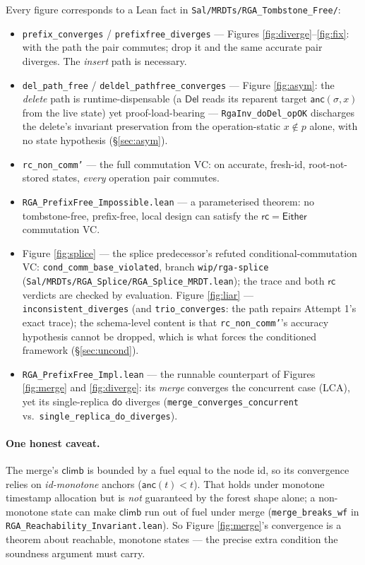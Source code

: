 \documentclass[11pt]{article}
\newcommand{\anc}{\mathsf{anc}}
\newcommand{\climb}{\mathsf{climb}}
\newcommand{\rc}{\mathsf{rc}}
\newcommand{\doo}{\mathsf{do}}
\newcommand{\Del}{\mathsf{Del}}
\newcommand{\Either}{\mathsf{Either}}
\begin{document}
Every figure corresponds to a Lean fact in
\texttt{Sal/MRDTs/RGA\_Tombstone\_Free/}:
\begin{itemize}
  \item \texttt{prefix\_converges} / \texttt{prefixfree\_diverges} --- Figures
        \ref{fig:diverge}--\ref{fig:fix}: with the path the pair commutes; drop it
        and the same accurate pair diverges. The \emph{insert} path is necessary.
  \item \texttt{del\_path\_free} / \texttt{deldel\_pathfree\_converges} --- Figure
        \ref{fig:asym}: the \emph{delete} path is runtime-dispensable (a $\Del$ reads
        its reparent target $\anc(\sigma,x)$ from the live state) yet
        proof-load-bearing --- \texttt{RgaInv\_doDel\_opOK} discharges the delete's
        invariant preservation from the operation-static $x\notin p$ alone, with no
        state hypothesis (\S\ref{sec:asym}).
  \item \texttt{rc\_non\_comm'} --- the full commutation VC: on accurate,
        fresh-id, root-not-stored states, \emph{every} operation pair commutes.
  \item \texttt{RGA\_PrefixFree\_Impossible.lean} --- a parameterised theorem: no
        tombstone-free, prefix-free, local design can satisfy the $\rc=\Either$
        commutation VC.
  \item Figure \ref{fig:splice} --- the splice predecessor's refuted
        conditional-commutation VC: \texttt{cond\_comm\_base\_violated}, branch
        \texttt{wip/rga-splice}
        (\texttt{Sal/MRDTs/RGA\_Splice/RGA\_Splice\_MRDT.lean}); the trace and
        both $\rc$ verdicts are checked by evaluation. Figure
        \ref{fig:liar} --- \texttt{inconsistent\_diverges} (and
        \texttt{trio\_converges}: the path repairs Attempt 1's exact trace);
        the schema-level content is that \texttt{rc\_non\_comm'}'s accuracy
        hypothesis cannot be dropped, which is what forces the conditioned
        framework (\S\ref{sec:uncond}).
  \item \texttt{RGA\_PrefixFree\_Impl.lean} --- the runnable counterpart of
        Figures \ref{fig:merge} and \ref{fig:diverge}: its \emph{merge} converges
        the concurrent case (LCA), yet its single-replica $\doo$ diverges
        (\texttt{merge\_converges\_concurrent} vs.\
        \texttt{single\_replica\_do\_diverges}).
\end{itemize}

\paragraph{One honest caveat.} The merge's $\climb$ is bounded by a fuel equal to
the node id, so its convergence relies on \emph{id-monotone} anchors
($\anc(t) < t$). That holds under monotone timestamp allocation but is \emph{not}
guaranteed by the forest shape alone; a non-monotone state can make $\climb$ run
out of fuel under merge (\texttt{merge\_breaks\_wf} in
\texttt{RGA\_Reachability\_Invariant.lean}). So Figure \ref{fig:merge}'s
convergence is a theorem about reachable, monotone states --- the precise extra
condition the soundness argument must carry.
\end{document}
